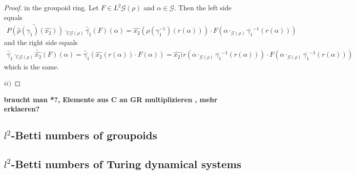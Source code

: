 \documentclass[12pt,a4paper]{scrartcl}
\numberwithin{equation}{section}
\newcommand{\C}{\mathbb{C}} %
\newcommand{\2}{\mathbb{Z} / 2 \mathbb{Z}}
\newcommand{\G}{\mathcal{G}}
\newcommand{\1}{\overline{1}}
\newcommand{\0}{\overline{0}}
\begin{document}
\begin{proof}
	in the groupoid ring.
	Let $F \in L^2 \G(\rho)$ and $\alpha \in \G$. Then the left side equals
	\begin{align*}
		\widetilde{P(\hat{\rho}(\gamma_1)(\hat{x_2}))} \cdot_{\C\G(\rho)} \widetilde{\bar{\gamma_1}}(F)(\alpha) = \hat{x_2}(\rho (\gamma_1^{-1})( r(\alpha))) \cdot F(\alpha \cdot_{\G (\rho)} \bar{\gamma_1}^{-1}(r(\alpha)))  
	\end{align*}
	and the right side equals
	\begin{align*}
		\widetilde{\bar{\gamma_1}} \cdot_{\C\G(\rho)} \tilde{\hat{x_2}}(F)(\alpha) = \widetilde{\bar{\gamma_1}}(\hat{x_2}(r(\alpha)) \cdot F(\alpha)) = \hat{x_2}(r(\alpha \cdot_{\G (\rho)} \bar{\gamma_1}^{-1}(r(\alpha))) \cdot F(\alpha \cdot_{\G (\rho)} \bar{\gamma_1}^{-1}(r(\alpha)))
	\end{align*}
	which is the same.
	
	$ii)$ 
\end{proof}
\textbf{braucht man *?, Elemente aus C an GR multiplizieren , mehr erklaeren?}
\subsection{$l^2$-Betti numbers of groupoids}
\subsection{$l^2$-Betti numbers of Turing dynamical systems}
\end{document}
